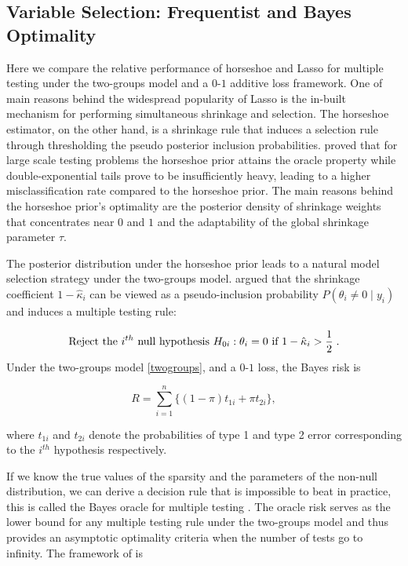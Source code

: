 \documentclass[sts,preprint]{imsart}
\begin{document}
\subsection{Variable Selection: Frequentist and Bayes Optimality}

Here we compare the relative performance of horseshoe and Lasso for multiple testing under the two-groups model and a $0$-$1$ additive loss framework. One of main reasons behind the widespread popularity of Lasso is the in-built mechanism for performing simultaneous shrinkage and selection. %
The horseshoe estimator, on the other hand, is a shrinkage rule that induces a selection rule through thresholding the pseudo posterior inclusion probabilities. \citet{datta2013asymptotic} proved that for large scale testing problems the horseshoe prior attains the oracle property while double-exponential tails prove to be insufficiently heavy, leading to a higher misclassification rate compared to the horseshoe prior. The main reasons behind the horseshoe prior's optimality are the posterior density of shrinkage weights that concentrates near $0$ and $1$ and the adaptability of the global shrinkage parameter $\tau$. 

The posterior distribution under the horseshoe prior leads to a natural model selection strategy under the two-groups model. \citet{carvalho2010horseshoe} argued that the shrinkage coefficient $1-\hat{\kappa}_i$ can be viewed as a pseudo-inclusion probability $P(\theta_i \ne 0 \mid y_i)$ and induces a multiple testing rule: 

\begin{equation}
  \text{Reject the $i^{th}$ null hypothesis } H_{0i} : \theta_i = 0 \text{ if }
  1-\hat{\kappa}_i > \frac{1}{2} \;. 
  \label{eq:hsrule}
\end{equation}
Under the two-groups model \eqref{twogroups}, and a $0$-$1$ loss, the Bayes risk is 

\[
R = \sum_{i=1}^{n} \{ (1- \pi) t_{1i} + \pi t_{2i} \}, 
\]

where $t_{1i}$ and $t_{2i}$ denote the probabilities of type 1 and type 2 error corresponding to the $i^{th}$ hypothesis respectively. 


If we know the true values of the sparsity and the parameters of the non-null distribution, we can derive a decision rule that is impossible to beat in practice, this is called the Bayes oracle for multiple testing \citep{bogdan2011asymptotic}. The oracle risk serves as the lower bound for any multiple testing rule under the two-groups model and thus provides an asymptotic optimality criteria when the number of tests go to infinity. The framework of \citet{bogdan2011asymptotic} is
 
\end{document}
